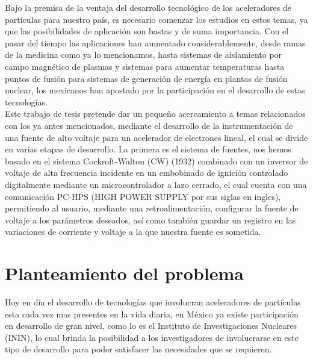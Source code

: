 Bajo la premisa de la ventaja del desarrollo tecnológico de los aceleradores de partículas para nuestro país, es necesario comenzar los estudios en estos temas, ya que las posibilidades de aplicación son bastas y de suma importancia. Con el pasar del tiempo las aplicaciones han aumentado considerablemente, desde ramas de la medicina como ya lo mencionamos, hasta sistemas de aislamiento por campo magnético de plasmas y sistemas para aumentar temperaturas hasta puntos de fusión para sistemas de generación de energía en plantas de fusión nuclear, los mexicanos han apostado por la participación en el desarrollo de estas tecnologías.\\

Este trabajo de tesis pretende dar un pequeño acercamiento a temas relacionados con los ya antes mencionados, mediante el desarrollo de la instrumentación de una fuente de alto voltaje para un acelerador de electrones lineal, el cual se divide en varias etapas de desarrollo. La primera es el sistema de fuentes, nos hemos basado en el sistema Cockroft-Walton (CW) (1932) \cite{Cockcroft} combinado con un inversor de voltaje de alta frecuencia incidente en un embobinado de ignición controlado digitalmente mediante un microcontrolador a lazo cerrado, el cual cuenta con una comunicación PC-HPS (HIGH POWER SUPPLY por sus siglas en ingles), permitiendo al usuario, mediante una retroalimentación, configurar la fuente de voltaje a los parámetros deseados, así como también guardar un registro en las variaciones de corriente y voltaje a la que nuestra fuente es sometida. \cite{C2}\\
\newpage



\section{Planteamiento del problema}
Hoy en día el desarrollo de tecnologías que involucran aceleradores de partículas esta cada vez mas presentes en la vida diaria, en México ya existe participación en desarrollo de gran nivel, como lo es el Instituto de Investigaciones Nucleares (ININ), lo cual brinda la posibilidad a los investigadores de involucrarse en este tipo de desarrollo para poder satisfacer las necesidades
que se requieren.\\

